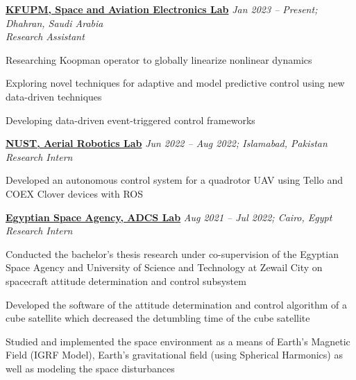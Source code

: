 \href{https://www.kfupm.edu.sa}{\textbf{KFUPM, Space and Aviation Electronics Lab}}
\hfill {\textit{Jan 2023 – Present; Dhahran, Saudi Arabia}}\\
\textit{Research Assistant}\\
\vspace{-0.5cm}
\begin{innerlist}
    \item Researching Koopman operator to globally linearize nonlinear dynamics
    \item Exploring novel techniques for adaptive and model predictive control using new data-driven techniques
    \item Developing data-driven event-triggered control frameworks
\end{innerlist}

\href{https://www.nust.edu.pk}{\textbf{NUST, Aerial Robotics Lab}}
\hfill {\textit{Jun 2022 – Aug 2022; Islamabad, Pakistan}}\\
\textit{Research Intern}\\
\vspace{-0.5cm}
\begin{innerlist}
    \item Developed an autonomous control system for a quadrotor UAV using Tello and COEX Clover devices with ROS
\end{innerlist}

\href{https://www.egsa.gov.eg}{\textbf{Egyptian Space Agency, ADCS Lab}}
\hfill {\textit{Aug 2021 – Jul 2022; Cairo, Egypt}}\\
\textit{Research Intern}\\
\vspace{-0.5cm}
\begin{innerlist}
\item  Conducted the bachelor’s thesis research under co-supervision of the Egyptian Space Agency and University of Science and Technology at Zewail City on spacecraft attitude determination and control subsystem
\item Developed the software of the attitude determination and control algorithm of a cube satellite which decreased the detumbling time of the cube satellite
\item  Studied and implemented the space environment as a means of Earth’s Magnetic Field (IGRF Model), Earth’s gravitational field (using Spherical Harmonics) as well as modeling the space disturbances
\end{innerlist}